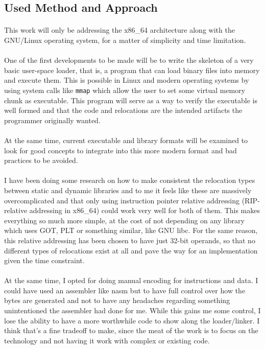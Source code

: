 \documentclass[12pt]{article}
\begin{document}
	\subsection{Used Method and Approach}
	\paragraph{}This work will only be addressing the x86\_64 architecture along with the GNU/Linux operating system, for a matter of simplicity and time limitation.
    
    \paragraph{}One of the first developments to be made will be to write the skeleton of a very basic user-space loader, that is, a program that can load binary files into memory and execute them. This is possible in Linux and modern operating systems by using system calls like \verb|mmap| which allow the user to set some virtual memory chunk as executable. This program will serve as a way to verify the executable is well formed and that the code and relocations are the intended artifacts the programmer originally wanted.
    
    \paragraph{}At the same time, current executable and library formats will be examined to look for good concepts to integrate into this more modern format and bad practices to be avoided.
    
    \paragraph{}I have been doing some research on how to make consistent the relocation types between static and dynamic libraries and to me it feels like these are massively overcomplicated and that only using instruction pointer relative addressing (RIP-relative addressing in x86\_64) could work very well for both of them. This makes everything so much more simple, at the cost of not depending on any library which uses GOT, PLT or something similar, like GNU libc. For the same reason, this relative addressing has been chosen to have just 32-bit operands, so that no different types of relocations exist at all and pave the way for an implementation given the time constraint.
    
    \paragraph{}At the same time, I opted for doing manual encoding for instructions and data. I could have used an assembler like nasm but to have full control over how the bytes are generated and not to have any headaches regarding something unintentioned the assembler had done for me. While this gains me some control, I lose the ability to have a more worthwhile code to show along the loader/linker. I think that's a fine tradeoff to make, since the meat of the work is to focus on the technology and not having it work with complex or existing code.
\end{document}
